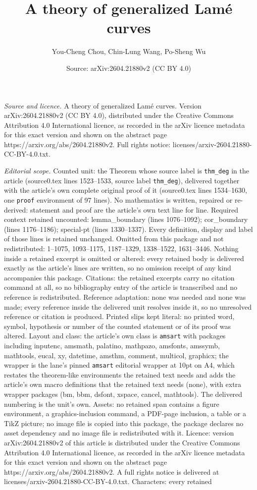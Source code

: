 \documentclass[10pt,a4paper]{amsart}
\title[A theory of generalized Lam\'e curves]{A theory of generalized Lam\'e curves}
\author{You-Cheng Chou, Chin-Lung Wang, Po-Sheng Wu}
\date{Source: arXiv:2604.21880v2 (CC BY 4.0)}
\begin{document}
\maketitle

\noindent\emph{Source and licence.} A theory of generalized Lam\'e curves. Version arXiv:2604.21880v2 (CC BY 4.0), distributed under the Creative Commons Attribution 4.0 International licence, as recorded in the arXiv licence metadata for this exact version and shown on the abstract page https://arxiv.org/abs/2604.21880v2. Full rights notice: licenses/arxiv-2604.21880-CC-BY-4.0.txt.\par\smallskip

\noindent\textit{Editorial scope.} Counted unit: the Theorem whose source label is \texttt{thm\_deg} in the article (source0.tex lines 1523--1533, source label \texttt{thm\_deg}), delivered together with the article's own complete original proof of it (source0.tex lines 1534--1630, one \texttt{proof} environment of 97 lines). No mathematics is written, repaired or re-derived: statement and proof are the article's own text line for line. Required context retained uncounted: lemma\_boundary (lines 1076--1092); cor\_boundary (lines 1176--1186); special-pt (lines 1330--1337). Every definition, display and label of those lines is retained unchanged. Omitted from this package and not redistributed: 1--1075, 1093--1175, 1187--1329, 1338--1522, 1631--3446. Nothing inside a retained excerpt is omitted or altered: every retained body is delivered exactly as the article's lines are written, so no omission receipt of any kind accompanies this package. Citations: the retained excerpts carry no citation command at all, so no bibliography entry of the article is transcribed and no reference is redistributed. Reference adaptation: none was needed and none was made; every reference inside the delivered unit resolves inside it, so no unresolved reference or citation is produced. Printed slips kept literal: no printed word, symbol, hypothesis or number of the counted statement or of its proof was altered. Layout and class: the article's own class is \texttt{amsart} with packages including inputenc, amsmath, palatino, mathpazo, amsfonts, amssymb, mathtools, eucal, xy, datetime, amsthm, comment, multicol, graphicx; the wrapper is the lane's pinned \texttt{amsart} editorial wrapper at 10pt on A4, which restates the theorem-like environments the retained text needs and adds the article's own macro definitions that the retained text needs (none), with extra wrapper packages (bm, bbm, dsfont, xspace, cancel, mathtools). The delivered numbering is the unit's own. Assets: no retained span contains a figure environment, a graphics-inclusion command, a PDF-page inclusion, a table or a TikZ picture; no image file is copied into this package, the package declares no asset dependency and no image file is redistributed with it. Licence: version arXiv:2604.21880v2 of this article is distributed under the Creative Commons Attribution 4.0 International licence, as recorded in the arXiv licence metadata for this exact version and shown on the abstract page https://arxiv.org/abs/2604.21880v2. A full rights notice is delivered at licenses/arxiv-2604.21880-CC-BY-4.0.txt. Characters: every retained 
\end{document}
